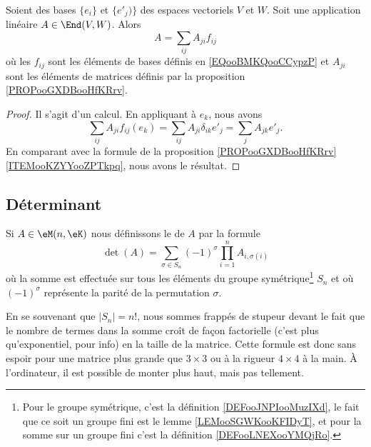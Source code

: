 \ssdem

\begin{proposition}		\label{PROPooPNQNooAZpojm}
	Soient des bases \( \{ e_i \}\) et \( \{ e'_j) \}\) des espaces vectoriels \( V\) et \( W\). Soit une application linéaire \( A\in\End(V,W)\). Alors
	\begin{equation}
		A=\sum_{ij}A_{ji}f_{ij}
	\end{equation}
	où les \( f_{ij}\) sont les éléments de bases définis en \eqref{EQooBMKQooCCypzP} et \( A_{ji}\) sont les éléments de matrices définis par la proposition \ref{PROPooGXDBooHfKRrv}.
\end{proposition}

\begin{proof}
	Il s'agit d'un calcul. En appliquant à \( e_k\), nous avons
	\begin{equation}
		\sum_{ij}A_{ji}f_{ij}(e_k)  = \sum_{ij}A_{ji}\delta_{ik}e'_j =\sum_{j}A_{jk}e'_j.
	\end{equation}
	En comparant avec la formule de la proposition \ref{PROPooGXDBooHfKRrv}\ref{ITEMooKZYYooZPTkpq}, nous avons le résultat.
\end{proof}

\subsection{Déterminant}

\begin{definition}      \label{DEFooYCKRooTrajdP}
	Si \( A\in\eM(n,\eK)\) nous définissons le  de \( A\) par la formule
	\begin{equation}
		\det(A)=\sum_{\sigma\in S_n}(-1)^{\sigma}\prod_{i=1}^nA_{i,\sigma(i)}
	\end{equation}
	où la somme est effectuée sur tous les éléments du groupe symétrique\footnote{Pour le groupe symétrique, c'est la définition \ref{DEFooJNPIooMuzIXd}, le fait que ce soit un groupe fini est le lemme \ref{LEMooSGWKooKFIDyT}, et pour la somme sur un groupe fini c'est la définition \ref{DEFooLNEXooYMQjRo}.} \( S_n\) et où \( (-1)^{\sigma}\) représente la parité de la permutation \( \sigma\).
\end{definition}
En se souvenant que \( | S_n |=n!\), nous sommes frappés de stupeur devant le fait que le nombre de termes dans la somme croît de façon factorielle (c'est plus qu'exponentiel, pour info) en la taille de la matrice. Cette formule est donc sans espoir pour une matrice plus grande que \( 3\times 3\) ou à la rigueur \( 4\times 4\) à la main. À l'ordinateur, il est possible de monter plus haut, mais pas tellement.

